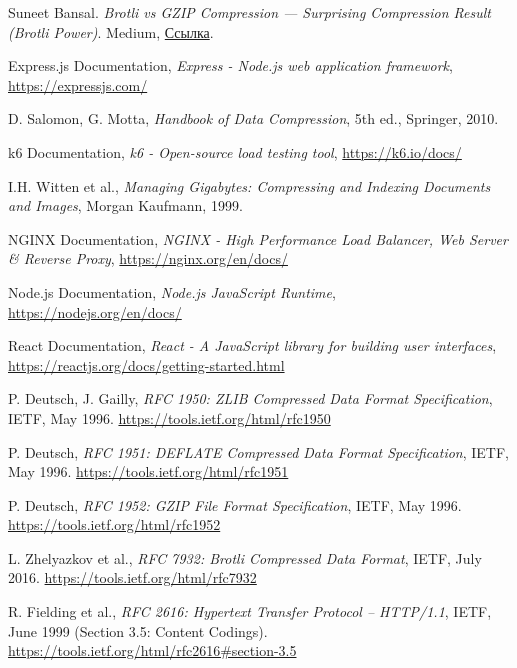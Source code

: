 \documentclass[12pt]{article}
\begin{document}
\begin{thebibliography}{9}
    Suneet Bansal.
    \textit{Brotli vs GZIP Compression — Surprising Compression Result (Brotli Power)}.
    Medium, \href{https://medium.com/@bansal.suneet/brotli-vs-gzip-compression-surprising-compression-result-brotli-power-782aac2ee29f}{Ссылка}.

    Express.js Documentation,
    \textit{Express - Node.js web application framework},
    \url{https://expressjs.com/}

    D. Salomon, G. Motta,
    \textit{Handbook of Data Compression},
    5th ed., Springer, 2010.


    k6 Documentation,
    \textit{k6 - Open-source load testing tool},
    \url{https://k6.io/docs/}

    I.H. Witten et al.,
    \textit{Managing Gigabytes: Compressing and Indexing Documents and Images},
    Morgan Kaufmann, 1999.

    NGINX Documentation,
    \textit{NGINX - High Performance Load Balancer, Web Server \& Reverse Proxy},
    \url{https://nginx.org/en/docs/}

    Node.js Documentation,
    \textit{Node.js JavaScript Runtime},
    \url{https://nodejs.org/en/docs/}
	
    React Documentation,
    \textit{React - A JavaScript library for building user interfaces},
    \url{https://reactjs.org/docs/getting-started.html}

    P. Deutsch, J. Gailly,
    \textit{RFC 1950: ZLIB Compressed Data Format Specification},
    IETF, May 1996.
    \url{https://tools.ietf.org/html/rfc1950}

    P. Deutsch,
    \textit{RFC 1951: DEFLATE Compressed Data Format Specification},
    IETF, May 1996.
    \url{https://tools.ietf.org/html/rfc1951}

    P. Deutsch,
    \textit{RFC 1952: GZIP File Format Specification},
    IETF, May 1996.
    \url{https://tools.ietf.org/html/rfc1952}

    L. Zhelyazkov et al.,
    \textit{RFC 7932: Brotli Compressed Data Format},
    IETF, July 2016.
    \url{https://tools.ietf.org/html/rfc7932}

    R. Fielding et al.,
    \textit{RFC 2616: Hypertext Transfer Protocol -- HTTP/1.1},
    IETF, June 1999 (Section 3.5: Content Codings).
    \url{https://tools.ietf.org/html/rfc2616#section-3.5}



\end{thebibliography}
\end{document}
